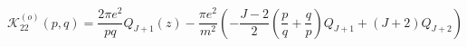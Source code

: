 \begin{equation}
\mathcal{K}_{22}^{\left( o\right) }\left( p,q\right) =\frac{2\pi e^{2}}{pq}%
Q_{J+1}\left( z\right) -\frac{\pi e^{2}}{m^{2}}\left( -\frac{J-2}{2}\left( 
\frac{p}{q}+\frac{q}{p}\right) Q_{J+1}+\left( J+2\right) Q_{J+2}\right)
\end{equation}

